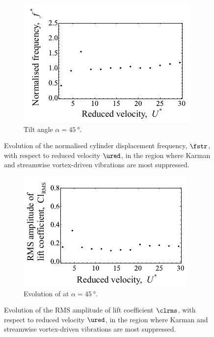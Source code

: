 \documentclass[a4paper,fleqn]{cas-sc}
\begin{document}
\begin{figure}
  \centering
  \begin{subfigure}[h]{0.38\textwidth}
    \includegraphics[width=\textwidth]{figs/yStrFreq3}
    \caption{Tilt angle $\alpha = \SI{45}{\degree}$.}
    \label{fig:yStrFreq3}
  \end{subfigure}
  \caption{Evolution of the normalised cylinder displacement frequency, $\fstr$, with respect to reduced velocity $\ured$, in the region where Karman and streamwise vortex-driven vibrations are most suppressed.} \label{fig:yStrFreqSuppressed}
\end{figure}

\begin{figure}
  \centering
  \begin{subfigure}[h]{0.38\textwidth}
    \includegraphics[width=\textwidth]{figs/clRMS3}
    \caption{Evolution of at $\alpha = \SI{45}{\degree}$.}
    \label{fig:clRMS3}
  \end{subfigure}

  \caption{Evolution of the RMS amplitude of lift coefficient $\clrms$,  with respect to reduced velocity $\ured$, in the region where Karman and streamwise vortex-driven vibrations are most suppressed.} \label{fig:clRMSSuppressed}
\end{figure}
\end{document}
